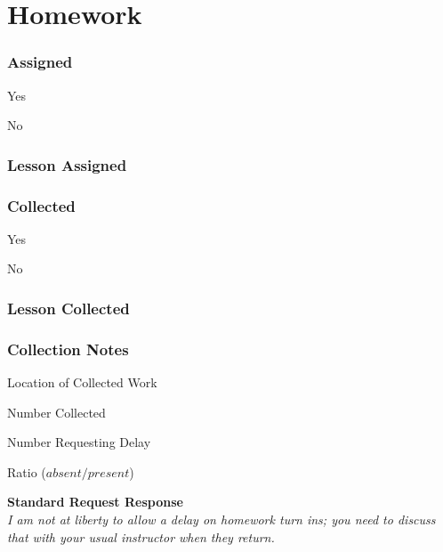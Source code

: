 \documentclass[10pt]{article}
\begin{document}
\section*{Homework}
\begin{framed}
\subsubsection*{Assigned}
\begin{todolist}
    \item Yes
    \item No
\end{todolist}

\subsubsection*{Lesson Assigned}
\begin{description}
    \item \uline{\hfill\null}
    \item \uline{\hfill\null}
\end{description}

\subsubsection*{Collected}
\begin{todolist}
    \item Yes
    \item No
\end{todolist}

\subsubsection*{Lesson Collected}
\begin{description}
    \item \uline{\hfill\null}
    \item \uline{\hfill\null}
\end{description}


\subsubsection*{Collection Notes}
\begin{description}
    \item[\small{Location of Collected Work}] \uline{\hfill\null}
    \item[\small{Number Collected}] \uline{\hfill\null}
    \item[\small{Number Requesting Delay}] \uline{\hfill\null}
    \item[\small{Ratio} \scriptsize{($absent/present$})] \uline{\hfill\null}
\end{description}
\vspace{0.2in}
\small{\textbf{Standard Request Response}} \\
\textit{\footnotesize{I am not at liberty to allow a delay on homework turn ins; you need to discuss that with your usual instructor when they return.}}

\vspace{0.2in}

\end{framed}
\end{document}
